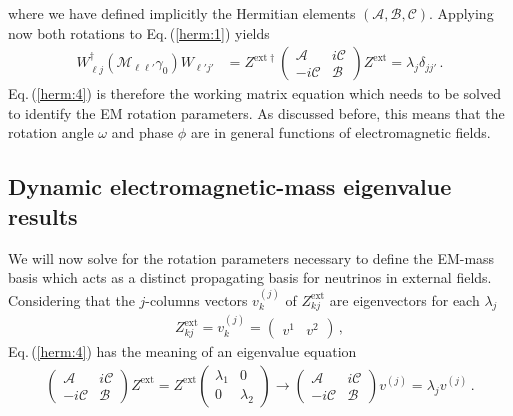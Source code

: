 \documentclass{ws-ijmpa}
\newcommand{\req}[1]{Eq.\,(\ref{#1})}
\begin{document}
where we have defined implicitly the Hermitian elements $(\mathcal{A},\mathcal{B},\mathcal{C})$.  Applying now both rotations 
to \req{herm:1} yields
\begin{align}
\label{herm:4}
W_{\ell j}^{\dag}(\mathcal{M}_{\ell\ell'}\gamma_{0})W_{\ell' j'} &= 
Z^{\mathrm{ext}\dag}\begin{pmatrix}
\mathcal{A} & i\mathcal{C}\\
-i\mathcal{C} & \mathcal{B}
\end{pmatrix}Z^\mathrm{ext}=\lambda_{j}\delta_{jj'}\,.
\end{align}
\req{herm:4} is therefore the working matrix equation which needs to be solved to identify the EM rotation parameters. As discussed before, this means that the rotation angle $\omega$ and phase $\phi$ are in general functions of electromagnetic fields.

\subsection{Dynamic electromagnetic-mass eigenvalue results}
\label{sec:emmass}
We will now solve for the rotation parameters necessary to define the EM-mass basis which acts as a distinct propagating basis for neutrinos in external fields. Considering that the $j$-columns vectors $v_{k}^{(j)}$ of $Z_{kj}^\mathrm{ext}$ are eigenvectors for each $\lambda_{j}$
\begin{align}
\label{herm:5}
Z_{kj}^\mathrm{ext}=v_{k}^{(j)}=
\begin{pmatrix}
v^{1} & v^{2}
\end{pmatrix}\,,
\end{align}
\req{herm:4} has the meaning of an eigenvalue equation
\begin{align}
\label{herm:6}
\begin{pmatrix}
\mathcal{A} & i\mathcal{C}\\
-i\mathcal{C} & \mathcal{B}
\end{pmatrix}Z^\mathrm{ext}=
Z^\mathrm{ext}\begin{pmatrix}
\lambda_{1} & 0\\
0 & \lambda_{2}
\end{pmatrix}\rightarrow
\begin{pmatrix}
\mathcal{A} & i\mathcal{C}\\
-i\mathcal{C} & \mathcal{B}
\end{pmatrix}v^{(j)}=\lambda_{j}v^{(j)}\,.
\end{align}
\end{document}
